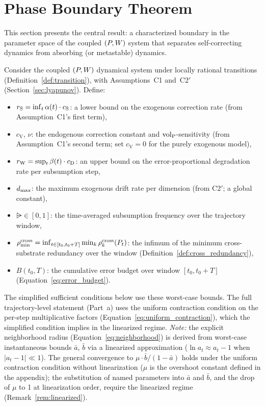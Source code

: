 \section{Phase Boundary Theorem}
\label{sec:phase_boundary}

This section presents the central result: a characterized boundary in
the parameter space of the coupled $(P, W)$ system that separates
self-correcting dynamics from absorbing (or metastable) dynamics.

\begin{theorem}
\label{thm:phase_boundary}
Consider the coupled $(P, W)$ dynamical system under locally rational
transitions (Definition~\ref{def:transition}), with
Assumptions~C1 and~C2$'$ (Section~\ref{sec:lyapunov}).  Define:
\begin{itemize}
\item $r_{\mathrm{S}} = \inf_t \alpha(t) \cdot c_{\mathrm{S}}$: a lower bound on
  the exogenous correction rate (from Assumption~C1's first term),
\item $c_{\mathrm{V}}$, $\nu$: the endogenous correction constant and
  ${\operatorname{vol}_{\mathrm{P}}}$-sensitivity (from Assumption~C1's second term; set
  $c_{\mathrm{V}} = 0$ for the purely exogenous model),
\item $r_{\mathrm{W}} = \sup_t \beta(t) \cdot c_{\mathrm{D}}$: an upper bound on
  the error-proportional degradation rate per subsumption step,
\item $d_{\mathrm{max}}$: the maximum exogenous drift rate per dimension (from
  C2$'$; a global constant),
\item $\rsub \in [0,1]$: the time-averaged subsumption frequency over
  the trajectory window,
\item $\rho_{\min}^{\mathrm{cross}} = \inf_{t \in [t_0, t_0+T]} \min_k
  \rho^{\mathrm{cross}}_k(P_t)$: the infimum of the minimum cross-substrate
  redundancy over the window
  (Definition~\ref{def:cross_redundancy}),
\item $B(t_0, T)$: the cumulative error budget over window
  $[t_0, t_0 + T]$ (Equation~\ref{eq:error_budget}).
\end{itemize}

\noindent The simplified sufficient conditions below use these
worst-case bounds.  The full trajectory-level statement (Part~a) uses
the uniform contraction condition on the per-step multiplicative
factors (Equation~\ref{eq:uniform_contraction}), which the simplified
condition implies in the linearized regime.  \emph{Note:} the explicit
neighborhood radius (Equation~\ref{eq:neighborhood}) is derived from
worst-case instantaneous bounds $\bar{a}$, $\bar{b}$ via a linearized
approximation ($\ln a_t \approx a_t - 1$ when $|a_t - 1| \ll 1$).
The general convergence to $\mu \cdot \bar{b}/(1-\bar{a})$ holds under
the uniform contraction condition without linearization ($\mu$ is the
overshoot constant defined in the appendix); the substitution of named
parameters into $\bar{a}$ and $\bar{b}$, and the drop of $\mu$ to 1
at linearization order, require the linearized regime
(Remark~\ref{rem:linearized}).


\end{theorem}
